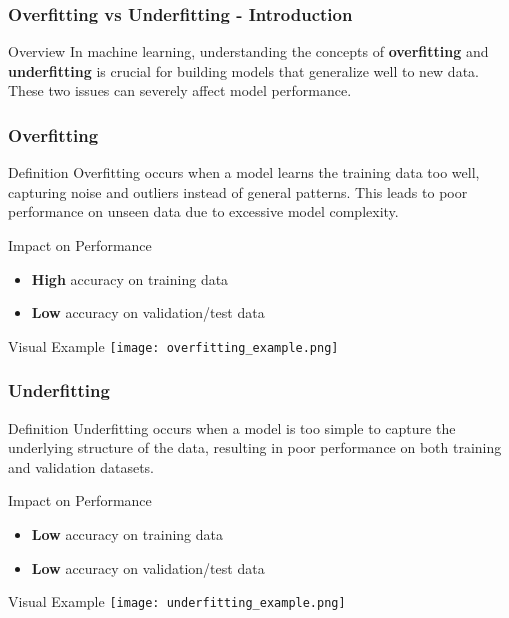 \documentclass[aspectratio=169]{beamer}
\begin{document}
\begin{frame}[fragile]
    \frametitle{Overfitting vs Underfitting - Introduction}
    \begin{block}{Overview}
        In machine learning, understanding the concepts of \textbf{overfitting} and \textbf{underfitting} is crucial for building models that generalize well to new data. These two issues can severely affect model performance.
    \end{block}
\end{frame}

\begin{frame}[fragile]
    \frametitle{Overfitting}
    \begin{block}{Definition}
        Overfitting occurs when a model learns the training data too well, capturing noise and outliers instead of general patterns. This leads to poor performance on unseen data due to excessive model complexity.
    \end{block}
    
    \begin{block}{Impact on Performance}
        \begin{itemize}
            \item \textbf{High} accuracy on training data
            \item \textbf{Low} accuracy on validation/test data
        \end{itemize}
    \end{block}

    \begin{block}{Visual Example}
        \texttt{[image: overfitting\_example.png]} %
    \end{block}
\end{frame}

\begin{frame}[fragile]
    \frametitle{Underfitting}
    \begin{block}{Definition}
        Underfitting occurs when a model is too simple to capture the underlying structure of the data, resulting in poor performance on both training and validation datasets.
    \end{block}
    
    \begin{block}{Impact on Performance}
        \begin{itemize}
            \item \textbf{Low} accuracy on training data
            \item \textbf{Low} accuracy on validation/test data
        \end{itemize}
    \end{block}

    \begin{block}{Visual Example}
        \texttt{[image: underfitting\_example.png]} %
    \end{block}
\end{frame}
\end{document}

